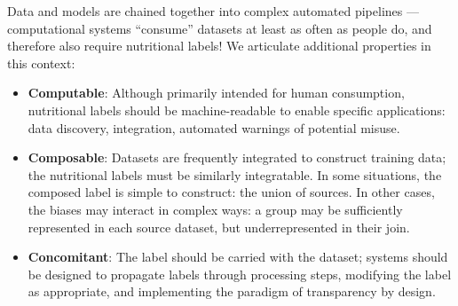Data and models are chained together into complex automated pipelines — computational systems ``consume'' datasets at least as often as people do, and therefore also require nutritional labels!  We articulate additional properties in this context:

\begin{itemize}
\item {\bf Computable}: Although primarily intended for human consumption, nutritional labels should be machine-readable to enable specific applications: data discovery, integration, automated warnings of potential misuse.  

\item {\bf Composable}: Datasets are frequently integrated to construct training data; the nutritional labels must be similarly integratable.  In some situations, the composed label is simple to construct: the union of sources. In other cases, the biases may interact in complex ways: a group may be sufficiently represented in each source dataset, but underrepresented in their join.  
\item {\bf Concomitant}: The label should be carried with the dataset; systems should be designed to propagate labels through processing steps, modifying the label as appropriate, and implementing the paradigm of transparency by design.
\end{itemize}


